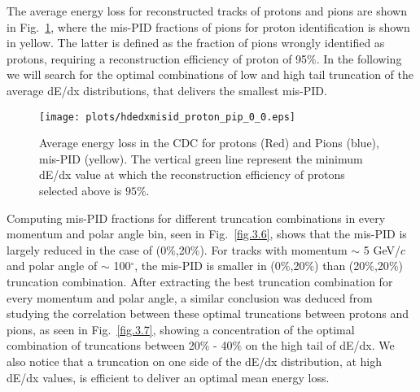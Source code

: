 The average energy loss for reconstructed tracks of protons and pions are shown in Fig.~\ref{fig.3.5}, where the mis-PID fractions of pions for proton identification is shown in yellow. The latter is defined as the fraction of pions wrongly identified as protons, requiring a reconstruction efficiency of proton of 95$\%$. In the following we will search for the optimal combinations of low and high tail truncation of the average dE/dx distributions, that delivers the smallest mis-PID.

\begin{figure}[H]
    \centering
    \texttt{[image: plots/hdedxmisid\_proton\_pip\_0\_0.eps]}
    \caption{\label{fig.3.5}Average energy loss in the CDC for protons (Red) and Pions (blue), mis-PID (yellow). The vertical green line represent the minimum dE/dx value at which the reconstruction efficiency of protons selected above is $95\%$.}
\end{figure}

Computing mis-PID fractions for different truncation combinations in every momentum and polar angle bin, seen in Fig.~\ref{fig.3.6}, shows that the mis-PID is largely reduced in the case of (0$\%$,20$\%$). For tracks with momentum $\sim$ 5 GeV/$c$ and polar angle of $\sim$ 100$^{\circ}$, the mis-PID is smaller in (0$\%$,20$\%$) than (20$\%$,20$\%$) truncation combination. After extracting the best truncation combination for every momentum and polar angle, a similar conclusion was deduced from studying the correlation between these optimal truncations between protons and pions, as seen in Fig.~\ref{fig.3.7}, showing a concentration of the optimal combination of truncations between 20$\%$ - 40$\%$ on the high tail of dE/dx. We also notice that a truncation on one side of the dE/dx distribution, at high dE/dx values, is efficient to deliver an optimal mean energy loss.

